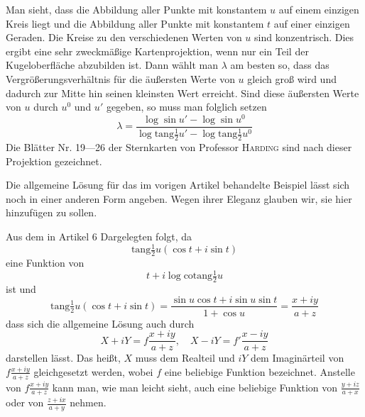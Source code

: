 Man sieht, dass die Abbildung aller Punkte mit konstantem \(u\) auf einem einzigen Kreis liegt und die Abbildung aller Punkte mit konstantem \(t\) auf einer einzigen Geraden. Die Kreise zu den verschiedenen Werten von \(u\) sind konzentrisch. Dies ergibt eine sehr zweckmäßige Kartenprojektion, wenn nur ein Teil der Kugeloberfläche abzubilden ist. Dann wählt man \(\lambda\) am besten so, dass das Vergrößerungsverhältnis für die
äußersten Werte von \(u\) gleich groß wird und dadurch zur Mitte hin seinen kleinsten Wert erreicht. Sind diese äußersten Werte von \(u\) durch \(u^0\) und \(u'\) gegeben, so muss man folglich setzen
\[
\lambda=\frac{\log\sin u'-\log\sin u^0}{\log\mathrm{tang}\frac{1}{2}u'-\log\mathrm{tang}\frac{1}{2}u^0}
\]
\noindent Die Blätter Nr. 19---26 der Sternkarten von Professor \textsc{Harding} sind nach dieser Projektion gezeichnet.

Die allgemeine Lösung für das im vorigen Artikel behandelte Beispiel lässt sich noch in einer anderen Form angeben. Wegen ihrer Eleganz glauben wir, sie hier hinzufügen zu sollen.

Aus dem in Artikel 6 Dargelegten folgt, da
\[
\mathrm{tang}\tfrac{1}{2}u(\cos t+i\sin t)
\]
\noindent eine Funktion von
\[
t+i\log\mathrm{cotang}\tfrac{1}{2}u
\]
\noindent ist und
\[
\mathrm{tang}\tfrac{1}{2}u(\cos t+i\sin t)=\frac{\sin u\cos t+i\sin u\sin t}{1+\cos u}=\frac{x+iy}{a+z}
\]
\noindent dass sich die allgemeine Lösung auch durch
\[
X+iY=f\frac{x+iy}{a+z},\quad X-iY=f'\frac{x-iy}{a+z}
\]
\noindent darstellen lässt. Das heißt, \(X\) muss dem Realteil und \(iY\) dem Imaginärteil von \(f\frac{x+iy}{a+z}\) gleichgesetzt werden, wobei \(f\) eine beliebige Funktion bezeichnet. Anstelle von \(f\frac{x+iy}{a+z}\) kann man, wie man leicht sieht, auch eine beliebige Funktion von \(\frac{y+iz}{a+x}\) oder von \(\frac{z+ix}{a+y}\) nehmen.

